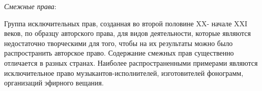 \textit{Смежные права}:

Группа исключительных прав, созданная во второй половине XX- начале XXI веков, по образцу авторского права, для видов деятельности, которые являются недостаточно творческими для того, чтобы на их результаты можно было распространить авторское право. Содержание смежных прав существенно отличается в разных странах. Наиболее распространенными примерами являются исключительное право музыкантов-исполнителей, изготовителей фонограмм, организаций эфирного вещания.\\
